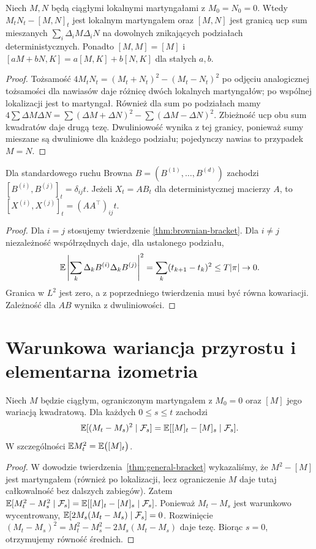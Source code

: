 \begin{twierdzenie}
Niech $M,N$ będą ciągłymi lokalnymi martyngałami
z $M_0=N_0=0$. Wtedy
$M_tN_t-[M,N]_t$ jest lokalnym martyngałem oraz
$[M,N]$ jest granicą ucp sum mieszanych
$\sum_i\Delta_iM\Delta_iN$ na dowolnych
znikających podziałach deterministycznych.
Ponadto $[M,M]=[M]$ i
$[aM+bN,K]=a[M,K]+b[N,K]$ dla stałych $a,b$.
\end{twierdzenie}
\begin{proof}
Tożsamość
$4M_tN_t=(M_t+N_t)^2-(M_t-N_t)^2$
po odjęciu analogicznej tożsamości dla nawiasów
daje różnicę dwóch lokalnych martyngałów;
po wspólnej lokalizacji jest to martyngał.
Również dla sum po podziałach mamy
$4\sum\Delta M\Delta N=
\sum(\Delta M+\Delta N)^2-
\sum(\Delta M-\Delta N)^2$.
Zbieżność ucp obu sum kwadratów daje drugą tezę.
Dwuliniowość wynika z tej granicy, ponieważ
sumy mieszane są dwuliniowe dla każdego podziału;
pojedynczy nawias to przypadek $M=N$.
\end{proof}

\begin{wniosek}
Dla standardowego ruchu Browna
$B=(B^{(1)},\ldots,B^{(d)})$ zachodzi
$[B^{(i)},B^{(j)}]_t=\delta_{ij}t$.
Jeżeli $X_t=AB_t$ dla deterministycznej macierzy $A$,
to $[X^{(i)},X^{(j)}]_t=(AA^\top)_{ij}t$.
\end{wniosek}
\begin{proof}
Dla $i=j$ stosujemy twierdzenie
\ref{thm:brownian-bracket}. Dla $i\ne j$ niezależność
współrzędnych daje, dla ustalonego podziału,
\[
\mathbb{E}\left|\sum_k\Delta_kB^{(i)}\Delta_kB^{(j)}\right|^2
=\sum_k (t_{k+1}-t_k)^2\le T|\pi|\to0.
\]
Granica w $L^2$ jest zero, a z poprzedniego
twierdzenia musi być równa kowariacji. Zależność
dla $AB$ wynika z dwuliniowości.
\end{proof}


\section{Warunkowa wariancja przyrostu i elementarna izometria}
\begin{twierdzenie}
Niech $M$ będzie ciągłym, ograniczonym martyngałem
z $M_0=0$ oraz $[M]$ jego wariacją kwadratową.
Dla każdych $0\le s\le t$ zachodzi
\[
\mathbb{E}[(M_t-M_s)^2\mid\mathcal{F}_s]
=\mathbb{E}[[M]_t-[M]_s\mid\mathcal{F}_s].
\]
W szczególności $\mathbb{E} M_t^2=\mathbb{E}\bigl([M]_t\bigr)$.
\end{twierdzenie}
\begin{proof}
W dowodzie twierdzenia~\ref{thm:general-bracket}
wykazaliśmy, że $M^2-[M]$ jest martyngałem
(również po lokalizacji, lecz ograniczenie $M$ daje
tutaj całkowalność bez dalszych zabiegów).
Zatem
$\mathbb{E}[M_t^2-M_s^2\mid\mathcal{F}_s]
=\mathbb{E}[[M]_t-[M]_s\mid\mathcal{F}_s]$.
Ponieważ $M_t-M_s$ jest warunkowo wycentrowany,
$\mathbb{E}[2M_s(M_t-M_s)\mid\mathcal{F}_s]=0$.
Rozwinięcie $(M_t-M_s)^2=M_t^2-M_s^2-2M_s(M_t-M_s)$
daje tezę. Biorąc $s=0$, otrzymujemy równość średnich.
\end{proof}

